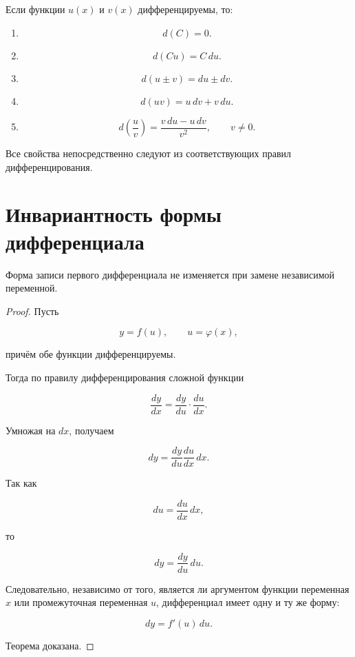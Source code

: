 \documentclass[14pt]{extreport}
\begin{document}
Если функции $u(x)$ и $v(x)$ дифференцируемы, то:

\begin{enumerate}
\item
\[
d(C)=0.
\]

\item
\[
d(Cu)=C\,du.
\]

\item
\[
d(u\pm v)=du\pm dv.
\]

\item
\[
d(uv)=u\,dv+v\,du.
\]

\item
\[
d\left(\frac{u}{v}\right)
=
\frac{v\,du-u\,dv}{v^2},
\qquad v\neq0.
\]
\end{enumerate}

Все свойства непосредственно следуют из соответствующих правил
дифференцирования.

\section{Инвариантность формы дифференциала}

\begin{theorem}
Форма записи первого дифференциала не изменяется при замене независимой
переменной.
\end{theorem}

\begin{proof}

Пусть

\[
y=f(u),
\qquad
u=\varphi(x),
\]

причём обе функции дифференцируемы.

Тогда по правилу дифференцирования сложной функции

\[
\frac{dy}{dx}
=
\frac{dy}{du}\cdot\frac{du}{dx}.
\]

Умножая на $dx$, получаем

\[
dy
=
\frac{dy}{du}\frac{du}{dx}\,dx.
\]

Так как

\[
du=\frac{du}{dx}\,dx,
\]

то

\[
dy
=
\frac{dy}{du}\,du.
\]

Следовательно, независимо от того, является ли аргументом функции
переменная $x$ или промежуточная переменная $u$, дифференциал имеет одну и
ту же форму:

\[
dy=f'(u)\,du.
\]

Теорема доказана.
\end{proof}
\end{document}
